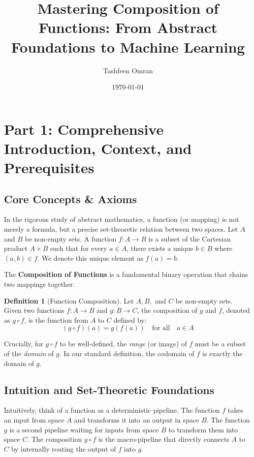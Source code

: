 \documentclass[11pt, a4paper]{article}
\title{\textbf{Mastering Composition of Functions: From Abstract Foundations to Machine Learning}}
\author{Tashfeen Omran}
\date{\today}
\theoremstyle{definition}
\newtheorem{definition}{Definition}[section]
\theoremstyle{remark}
\begin{document}
\maketitle
\tableofcontents
\newpage

\section{Part 1: Comprehensive Introduction, Context, and Prerequisites}

\subsection{Core Concepts \& Axioms}
In the rigorous study of abstract mathematics, a function (or mapping) is not merely a formula, but a precise set-theoretic relation between two spaces. Let $A$ and $B$ be non-empty sets. A function $f: A \to B$ is a subset of the Cartesian product $A \times B$ such that for every $a \in A$, there exists a unique $b \in B$ where $(a, b) \in f$. We denote this unique element as $f(a) = b$.

The \textbf{Composition of Functions} is a fundamental binary operation that chains two mappings together. 
\begin{definition}[Function Composition]
Let $A, B,$ and $C$ be non-empty sets. Given two functions $f: A \to B$ and $g: B \to C$, the composition of $g$ and $f$, denoted as $g \circ f$, is the function from $A$ to $C$ defined by:
\[ (g \circ f)(a) = g(f(a)) \quad \text{for all} \quad a \in A \]
\end{definition}
Crucially, for $g \circ f$ to be well-defined, the \textit{range} (or image) of $f$ must be a subset of the \textit{domain} of $g$. In our standard definition, the codomain of $f$ is exactly the domain of $g$.

\subsection{Intuition and Set-Theoretic Foundations}
Intuitively, think of a function as a deterministic pipeline. The function $f$ takes an input from space $A$ and transforms it into an output in space $B$. The function $g$ is a second pipeline waiting for inputs from space $B$ to transform them into space $C$. The composition $g \circ f$ is the macro-pipeline that directly connects $A$ to $C$ by internally routing the output of $f$ into $g$. 
\end{document}
